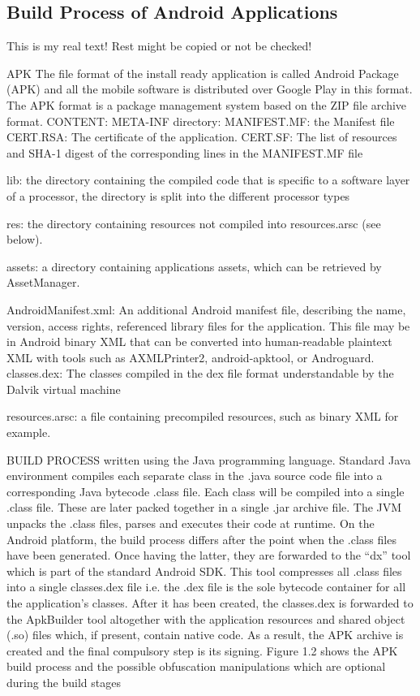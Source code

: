 \subsection{Build Process of Android Applications} \label{subsection:foundation-android-build}
This is my real text! Rest might be copied or not be checked!


%
APK
The file format of the install ready application is called Android
Package (APK) and all the mobile software is distributed over Google Play in this format. The APK format is a package management system based on the ZIP file archive format.\newline
CONTENT:
META-INF directory:
    MANIFEST.MF: the Manifest file
    CERT.RSA: The certificate of the application.
    CERT.SF: The list of resources and SHA-1 digest of the corresponding lines in the MANIFEST.MF file

lib: the directory containing the compiled code that is specific to a software layer of a processor, the directory is split into the different processor types

res: the directory containing resources not compiled into resources.arsc (see below).

assets: a directory containing applications assets, which can be retrieved by AssetManager.

AndroidManifest.xml: An additional Android manifest file, describing the name, version, access rights, referenced library files for the application. This file may be in Android binary XML that can be converted into human-readable plaintext XML with tools such as AXMLPrinter2, android-apktool, or Androguard.
classes.dex: The classes compiled in the dex file format understandable by the Dalvik virtual machine

resources.arsc: a file containing precompiled resources, such as binary XML for example.

BUILD PROCESS
written using the Java programming language.\newline
Standard Java environment compiles each separate class in the .java source code file into a corresponding Java bytecode .class file. Each class will be compiled into a single .class file. These are later packed together in a single .jar archive file. The JVM unpacks the .class files, parses and executes their code at runtime.\newline
On the Android platform, the build process differs after the point when the .class files have been generated. Once having the latter, they are forwarded to the “dx” tool which is part of the standard Android SDK. This tool compresses all .class files into a single classes.dex file i.e. the .dex file is the sole bytecode container for all the application’s classes. After it has been created, the classes.dex is forwarded to the ApkBuilder tool altogether with the application resources and shared object (.so) files which, if present, contain native code. As a result, the APK archive is created and the final compulsory step is its signing. Figure 1.2 shows the APK build process and the
possible obfuscation manipulations which are optional during the build stages\newline


